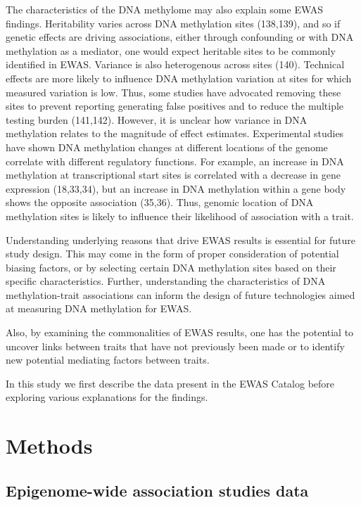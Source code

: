 \documentclass[11pt,oneside]{bristolthesis}
\begin{document}
The characteristics of the DNA methylome may also explain some EWAS findings. Heritability varies across DNA methylation sites (138,139), and so if genetic effects are driving associations, either through confounding or with DNA methylation as a mediator, one would expect heritable sites to be commonly identified in EWAS. Variance is also heterogenous across sites (140). Technical effects are more likely to influence DNA methylation variation at sites for which measured variation is low. Thus, some studies have advocated removing these sites to prevent reporting generating false positives and to reduce the multiple testing burden (141,142). However, it is unclear how variance in DNA methylation relates to the magnitude of effect estimates. Experimental studies have shown DNA methylation changes at different locations of the genome correlate with different regulatory functions. For example, an increase in DNA methylation at transcriptional start sites is correlated with a decrease in gene expression (18,33,34), but an increase in DNA methylation within a gene body shows the opposite association (35,36). Thus, genomic location of DNA methylation sites is likely to influence their likelihood of association with a trait.

Understanding underlying reasons that drive EWAS results is essential for future study design. This may come in the form of proper consideration of potential biasing factors, or by selecting certain DNA methylation sites based on their specific characteristics. Further, understanding the characteristics of DNA methylation-trait associations can inform the design of future technologies aimed at measuring DNA methylation for EWAS.

Also, by examining the commonalities of EWAS results, one has the potential to uncover links between traits that have not previously been made or to identify new potential mediating factors between traits.

In this study we first describe the data present in the EWAS Catalog before exploring various explanations for the findings.

\newpage

\hypertarget{methods-04}{%
\section{Methods}\label{methods-04}}

\hypertarget{epigenome-wide-association-studies-data}{%
\subsection{Epigenome-wide association studies data}\label{epigenome-wide-association-studies-data}}
\end{document}
